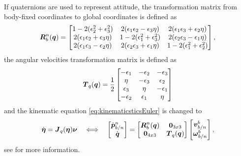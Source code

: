 
If quaternions are used to represent attitude, the transformation matrix from body-fixed coordinates to global coordinates is defined as 
\begin{equation}
\boldsymbol{R}^n_b(\boldsymbol{q}) = \begin{bmatrix}
  1 - 2(\epsilon_2^2 + \epsilon_3^2) & 2(\epsilon_1\epsilon_2 - \epsilon_3\eta)   & 2(\epsilon_1\epsilon_3 + \epsilon_2\eta) \\
     2(\epsilon_1\epsilon_2 + \epsilon_3\eta) &  1-2(\epsilon_1^2 + \epsilon_3^2) & 2(\epsilon_2\epsilon_3-\epsilon_1\eta)    \\
     2(\epsilon_1\epsilon_3 - \epsilon_2\eta) &  2(\epsilon_2\epsilon_3 + \epsilon_1\eta)  & 1-2(\epsilon_1^2 + \epsilon_2^2) \\
\end{bmatrix},
\end{equation} the angular velocities transformation matrix is defined as
\begin{equation} \label{eq:Tquat}
\boldsymbol{T}_q(\boldsymbol{q}) = \frac{1}{2}
\begin{bmatrix}
-\epsilon_1  & -\epsilon_2  & -\epsilon_3 \\
\eta   & -\epsilon_3 & \epsilon_2 \\
\epsilon_3 & \eta    &  -\epsilon_1 \\
-\epsilon_2 & \epsilon_1    & \eta \\
\end{bmatrix}
\end{equation}
and the kinematic equation \eqref{eq:kinematicsticsEuler} is changed to 
\begin{equation}
\dot{\boldsymbol{\eta}} = \boldsymbol{J}_q(\boldsymbol{\eta})\boldsymbol{\nu}
\quad\Longleftrightarrow\quad
\begin{bmatrix}
\dot{\boldsymbol{p}}^n_{b/n} \\
\dot{\boldsymbol{q}}
\end{bmatrix}
=
\begin{bmatrix}
\boldsymbol{R}^n_b(\boldsymbol{q}) & \boldsymbol{0}_{3x3} \\
\boldsymbol{0}_{4x3} & \boldsymbol{T}_q(\boldsymbol{q})
\end{bmatrix}
\begin{bmatrix}
\boldsymbol{v}^b_{b/n} \\
\boldsymbol{\omega}^b_{b/n}
\end{bmatrix},
\end{equation}
see \citet[Ch. 2]{fossen2011} for more information. 
